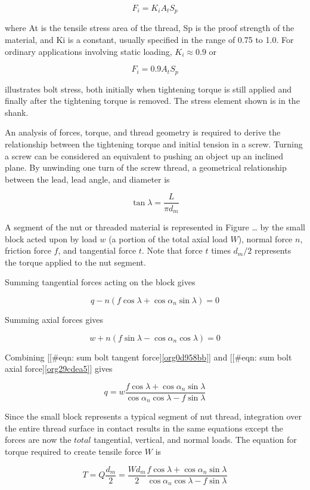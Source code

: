 \documentclass[a4paper,openany,12pt]{book}
\begin{document}
{{$$F_i = K_iA_tS_p$$

where At is the tensile stress area of the thread, Sp is the proof
strength of the material, and Ki is a constant, usually specified in the
range of 0.75 to 1.0. For ordinary applications involving static
loading, \(K_i \approx 0.9\) or

$$F_i = 0.9A_tS_p$$

illustrates bolt stress, both initially when tightening torque is still
applied and finally after the tightening torque is removed. The stress
element shown is in the shank.


An analysis of forces, torque, and thread geometry is required to derive
the relationship between the tightening torque and initial tension in a
screw. Turning a screw can be considered an equivalent to pushing an
object up an inclined plane. By unwinding one turn of the screw thread,
a geometrical relationship between the lead, lead angle, and diameter is

$$\tan \lambda  = \frac{L}{\pi d_m}$$

A segment of the nut or threaded material is represented in Figure \ldots{}
by the small block acted upon by load \(w\) (a portion of the total axial
load \(W\)), normal force \(n\), friction force \(f\), and tangential force
\(t\). Note that force \(t\) times \(d_m/2\) represents the torque applied to
the nut segment.

Summing tangential forces acting on the block gives

$$q - n(f\cos \lambda  + \cos \alpha_n\sin \lambda ) = 0$$

Summing axial forces gives

$$w + n(f\sin \lambda  - \cos \alpha_n\cos \lambda ) = 0$$

Combining
[[\#eqn: sum bolt tangent force]\ref{org0d958bb}] and
[[\#eqn: sum bolt axial force]\ref{org29cdea5}] gives

$$q = w\frac{f\cos \lambda + \cos \alpha_n\sin \lambda }{\cos \alpha_n\cos \lambda  - f\sin \lambda }$$

Since the small block represents a typical segment of nut thread,
integration over the entire thread surface in contact results in the
same equations except the forces are now the \(total\) tangential,
vertical, and normal loads. The equation for torque required to create
tensile force \(W\) is

$$T = Q\frac{d_m}{2} = \frac{Wd_m}{2}\frac{f\cos \lambda + \cos \alpha_n\sin \lambda }{\cos \alpha_n\cos \lambda - f\sin \lambda }$$

}}
\end{document}

